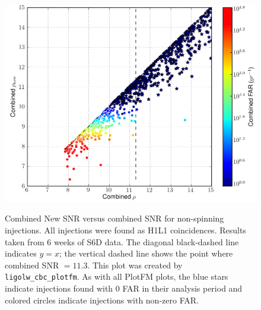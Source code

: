 \begin{figure}[p]
\center
\includegraphics[width=6in]{figures/ligo_south/H1L1-ligolw_cbc_plotfm_Non-Spinning_mathcalM_mathrminj_0_3_F1_BNSLININJ+BNSLOGINJ+NSBHLININJ+NSBHLOGINJ+BBHLININJ+BBHLOGINJ_PLOTTED-961545543-3628944.png}
\label{fig:ligo_south-newsnr_v_snr}
\caption{Combined New SNR versus combined SNR for non-spinning injections. All
injections were found as H1L1 coincidences. Results taken from $6$ weeks of S6D
data. The diagonal black-dashed line indicates $y=x$; the vertical dashed line
shows the point where combined SNR $= 11.3$. This plot was created by
\texttt{ligolw\_cbc\_plotfm}. As with all PlotFM plots, the blue stars indicate
injections found with $0$ FAR in their analysis period and colored circles
indicate injections with non-zero FAR.}
\end{figure}

